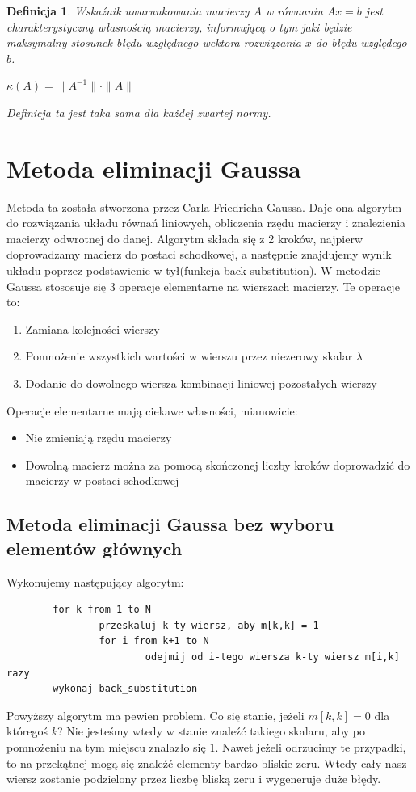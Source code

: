 \documentclass[a4paper,10pt]{article}
\newtheorem{definition}{Definicja}
\begin{document}
\begin{definition}
    Wskaźnik uwarunkowania macierzy $A$ w równaniu $Ax = b$ jest charakterystyczną własnością macierzy, informującą o tym jaki będzie maksymalny stosunek błędu względnego wektora rozwiązania $x$ do błędu względego $b$.
    \begin{center}
        $ \kappa(A) = \|A^{-1}\| \cdot \|A\|$
    \end{center}
    Definicja ta jest taka sama dla każdej zwartej normy.
\end{definition}
\newpage
\section{Metoda eliminacji Gaussa}
Metoda ta została stworzona przez Carla Friedricha Gaussa. Daje ona algorytm do rozwiązania układu równań liniowych,
obliczenia rzędu macierzy i znalezienia macierzy odwrotnej do danej. Algorytm składa się z 2 kroków, najpierw doprowadzamy
macierz do postaci schodkowej, a następnie znajdujemy wynik układu poprzez podstawienie w tył(funkcja back substitution).
W metodzie Gaussa stososuje się 3 operacje elementarne na wierszach macierzy. Te operacje to:
\begin{enumerate}
	\item Zamiana kolejności wierszy
	\item Pomnożenie wszystkich wartości w wierszu przez niezerowy skalar $\lambda$
	\item Dodanie do dowolnego wiersza kombinacji liniowej pozostałych wierszy
\end{enumerate}
Operacje elementarne mają ciekawe własności, mianowicie:
\begin{itemize}
	\item Nie zmieniają rzędu macierzy
	\item Dowolną macierz można za pomocą skończonej liczby kroków doprowadzić do macierzy w postaci schodkowej
\end{itemize}
\subsection{Metoda eliminacji Gaussa bez wyboru elementów głównych}
Wykonujemy następujący algorytm:
\begin{verbatim}
        for k from 1 to N
                przeskaluj k-ty wiersz, aby m[k,k] = 1
                for i from k+1 to N
                        odejmij od i-tego wiersza k-ty wiersz m[i,k] razy
        wykonaj back_substitution
\end{verbatim}
Powyższy algorytm ma pewien problem. Co się stanie, jeżeli $m[k,k] = 0$ dla któregoś $k$? Nie jesteśmy wtedy w stanie
znaleźć takiego skalaru, aby po pomnożeniu na tym miejscu znalazło się $1$. Nawet jeżeli odrzucimy te przypadki,
to na przekątnej mogą się znaleźć elementy bardzo bliskie zeru. Wtedy cały nasz wiersz zostanie podzielony przez
liczbę bliską zeru i wygeneruje duże błędy.
\end{document}
